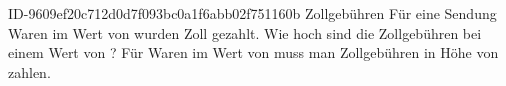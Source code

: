 \begin{exercise}
      {ID-9609ef20c712d0d7f093bc0a1f6abb02f751160b}
      {Zollgebühren}
  \ifproblem\problem
    Für eine Sendung Waren im Wert von  wurden  Zoll gezahlt.
    Wie hoch sind die Zollgebühren bei einem Wert von ?
  \fi
  \ifoutcome\outcome
    Für Waren im Wert von  muss man Zollgebühren in Höhe von  zahlen.
  \fi
\end{exercise}
